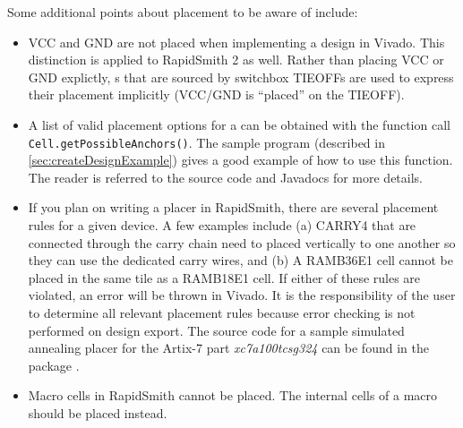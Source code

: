 \vspace{.2cm}
\noindent
Some additional points about placement to be aware of include: 

\begin {itemize}
  \item VCC and GND \cells are not placed when implementing a design in Vivado.
  This distinction is applied to RapidSmith 2 as well. Rather than placing VCC
  or GND explictly, s that are sourced by switchbox TIEOFFs are
  used to express their placement implicitly (VCC/GND is ``placed'' on the
  TIEOFF).
  \item A list of valid placement options for a \cell can be obtained with the
  function call \texttt{Cell.getPossible\-Anchors()}. The sample program
   (described in \autoref{sec:createDesignExample})
  gives a good example of how to use this function. The reader is referred to
  the source code and Javadocs for more details.
  \item If you plan on writing a placer in RapidSmith, there are several
  placement rules for a given device. A few examples include (a) CARRY4 \cells
  that are connected through the carry chain need to placed vertically to one
  another so they can use the dedicated carry wires, and (b) A RAMB36E1 cell
  cannot be placed in the same tile as a RAMB18E1 cell. If either of these
  rules are violated, an error will be thrown in Vivado. It is the
  responsibility of the user to determine all relevant placement rules
  because error checking is not performed on design export. The source code for
  a sample simulated annealing placer for the Artix-7 part {\em
  xc7a100tcsg324} can be found in the package
  .
  \item Macro cells in RapidSmith cannot be placed. The internal cells of a
  macro should be placed instead.
\end{itemize}
